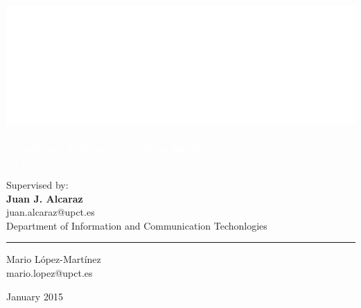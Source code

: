 \graphicspath{ {img/} }

\makeatletter                   
\def\printauthor{%
    {\large \@author}}          
\makeatother

\author{%

    }
\begin{titlingpage}
\BgThispage
{}
\vspace*{0.25\textheight}
\noindent
\includegraphics{logo.eps}\\\\ 
\textcolor{white}{\Huge\textbf{{Coexistence Policies in Cognitive Radio}}}\vspace*{0.25cm}\\
\noindent
\hspace*{1cm}\textcolor{white}{\normalsize{Ph.D. dissertation (draft)}}
\vspace*{3cm}\par
\noindent
\hspace*{3.5cm}
\begin{minipage}{0.35\linewidth}
    \begin{flushright}
    Supervised by: \\
    \textbf{Juan J. Alcaraz}\\
    juan.alcaraz@upct.es\\
    \vspace*{1cm}
    Department of Information and Communication Techonlogies\\
    \end{flushright}
\end{minipage} \hspace{15pt}
%
\begin{minipage}{0.02\linewidth}
    \rule{1pt}{175pt}
\end{minipage} \hspace{0pt}
%
\begin{minipage}{0.63\linewidth}
\vspace{8pt}
    \Large{Mario L\'{o}pez-Mart\'{i}nez} \\
    \large{mario.lopez@upct.es} \\
\end{minipage}
\vfill
\hspace{0.5\linewidth}January 2015
\end{titlingpage}
\restoregeometry